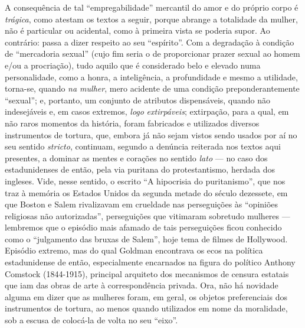 A consequência de tal ``empregabilidade'' mercantil do amor e do próprio
corpo é \emph{trágica}, como atestam os textos a seguir, porque abrange
a totalidade da mulher, não é particular ou acidental, como à primeira
vista se poderia supor. Ao contrário: passa a dizer respeito ao seu
``espírito''. Com a degradação à condição de ``mercadoria sexual'' (cujo
fim seria o de proporcionar prazer sexual ao homem e/ou a procriação),
tudo aquilo que é considerado belo e elevado numa personalidade, como a
honra, a inteligência, a profundidade e mesmo a utilidade, torna-se,
quando \emph{na mulher}, mero acidente de uma condição
preponderantemente ``sexual''; e, portanto, um conjunto de atributos
dispensáveis, quando não indesejáveis e, em casos extremos, \emph{logo}
\emph{extirpáveis}; extirpação, para a qual, em não raros momentos da
história, foram fabricados e utilizados diversos instrumentos de
tortura, que, embora já não sejam vistos sendo usados por aí no seu
sentido \emph{stricto}, continuam, segundo a denúncia reiterada nos
textos aqui presentes, a dominar as mentes e corações no sentido
\emph{lato} --- no caso dos estadunidenses de então, pela via puritana do
protestantismo, herdada dos ingleses. Vide, nesse sentido, o escrito ``A
hipocrisia do puritanismo'', que nos traz à memória os Estados Unidos da
segunda metade do século dezessete, em que Boston e Salem rivalizavam em
crueldade nas perseguições às ``opiniões religiosas não autorizadas'',
perseguições que vitimaram sobretudo mulheres --- lembremos que o
episódio mais afamado de tais perseguições ficou conhecido como o
``julgamento das bruxas de Salem'', hoje tema de filmes de Hollywood.
Episódio extremo, mas do qual Goldman encontrava os ecos na política
estadunidense de então, especialmente encarnados na figura do político
Anthony Comstock (1844-1915), principal arquiteto dos mecanismos de
censura estatais que iam das obras de arte à correspondência privada.
Ora, não há novidade alguma em dizer que as mulheres foram, em geral, os
objetos preferenciais dos instrumentos de tortura, ao menos quando
utilizados em nome da moralidade, sob a escusa de colocá-la de volta no
seu ``eixo''.


